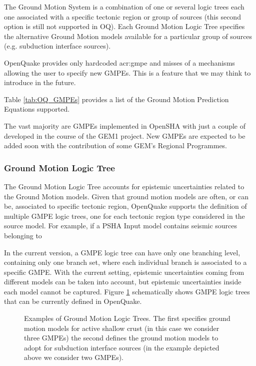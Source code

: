 
%
The Ground Motion System is a combination of one or several logic 
trees each one associated with a specific tectonic region or group 
of sources (this second option is still not supported in OQ).
%
Each Ground Motion Logic Tree specifies the alternative Ground Motion 
models available for a particular group of sources (e.g. subduction 
interface sources).

OpenQuake provides only hardcoded \gls{acr:gmpe} 
and misses of a mechanisms allowing the user to specify new GMPEs. 
This is a feature that we may think to introduce in the future. 

Table \ref{tab:OQ_GMPEs} provides a list of the Ground Motion Prediction 
Equations supported. 

The vast majority are GMPEs implemented in OpenSHA with just a couple 
of developed in the course of the GEM1 project. New GMPEs are expected 
to be added soon with the contribution of some GEM's Regional Programmes.

\subsubsection{Ground Motion Logic Tree}
\label{hazard:gmpe_logic_tree}
The Ground Motion Logic Tree accounts for epistemic uncertainties related 
to the Ground Motion models.  
%
Given that ground motion models are often, or can be, associated to 
specific tectonic region,  OpenQuake supports the definition of multiple 
GMPE logic trees, one for each tectonic region type considered in 
the source model. 
% 
For example, if a PSHA Input model contains seismic sources belonging to 


In the current version, a GMPE logic tree can have only one 
branching level, containing only one branch set, where each individual branch 
is associated to a specific GMPE. With the current setting, epistemic 
uncertainties coming from different models can be taken into account, but 
epistemic uncertainties inside each model cannot be captured.
Figure \ref{fig:GMPELogicTree} schematically shows GMPE logic trees that can 
be currently defined in OpenQuake.
\renewcommand{\psedge}{\ncdiag[armA=0,angleB=180,armB=1cm]}
\begin{figure}[!hb]
\centering

\caption{Examples of Ground Motion Logic Trees. The first specifies ground
motion models for active shallow crust (in this case we consider three GMPEs) 
the second defines the ground motion models to adopt for subduction interface 
sources (in the example depicted above we consider two GMPEs).}
\label{fig:GMPELogicTree}
\end{figure}

